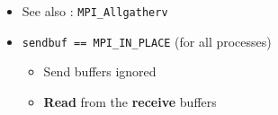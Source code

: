 \documentclass[xcolor={x11names,svgnames,psnames}]{beamer}
\begin{document}
\begin{frame}[fragile]
  \begin{itemize}
  \item See also : \texttt{MPI_Allgatherv}

    \pause
    
  \item \texttt{sendbuf == MPI_IN_PLACE} (for all processes)
    \begin{itemize}
    \item Send buffers ignored
    \item \textbf{Read} from the \textbf{receive} buffers
    \end{itemize}
  \end{itemize}
\end{frame}



\end{document}
